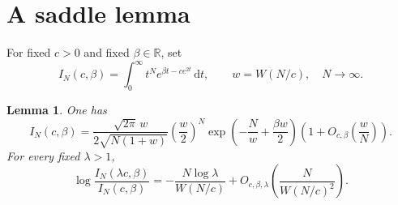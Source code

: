 \documentclass[11pt]{article}
\newtheorem{lemma}[theorem]{Lemma}
\newcommand{\dd}{\,\mathrm d}
\newcommand{\R}{\mathbb R}
\begin{document}
\section{A saddle lemma}
For fixed $c>0$ and fixed $\beta\in\R$, set
\[
 I_N(c,\beta)=\int_0^\infty t^N e^{\beta t-ce^{2t}}\dd t,
 \qquad w=W(N/c),\quad N\to\infty.
\]
\begin{lemma}\label{lem:saddle}
One has
\begin{equation}\label{eq:saddle}
 I_N(c,\beta)=\frac{\sqrt{2\pi}\,w}{2\sqrt{N(1+w)}}
 \left(\frac w2\right)^N
 \exp\!\left(-\frac Nw+\frac{\beta w}{2}\right)
 \left(1+O_{c,\beta}\!\left(\frac wN\right)\right).
\end{equation}
For every fixed $\lambda>1$,
\begin{equation}\label{eq:saddle-ratio}
 \log\frac{I_N(\lambda c,\beta)}{I_N(c,\beta)}
 =-\frac{N\log\lambda}{W(N/c)}
 +O_{c,\beta,\lambda}\!\left(\frac{N}{W(N/c)^2}\right).
\end{equation}
\end{lemma}
\end{document}
